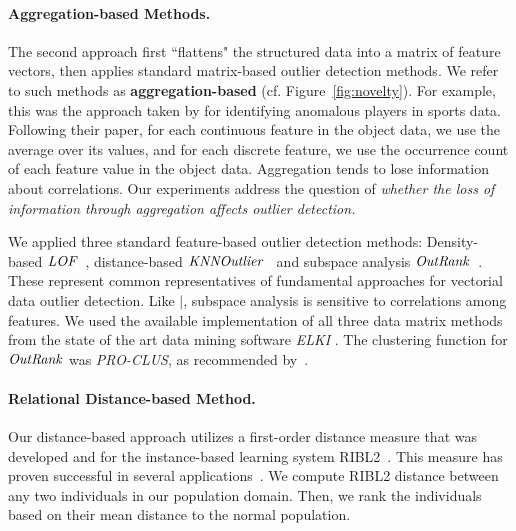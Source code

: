 {					%
					\paragraph{Aggregation-based Methods.}
					The second approach first ``flattens" the structured data into a matrix of feature vectors, then applies standard matrix-based outlier detection methods. We refer to such methods as \textbf{aggregation-based}
					(cf. Figure~\ref{fig:novelty}). For example, this was the approach taken by \citet{Breunig2000} for identifying anomalous players in sports data. Following their paper, for each continuous feature in the object data, we use the average over its values, and for each discrete feature, we use the occurrence count of each feature value in the object data. Aggregation 
					tends to lose information about correlations.
					Our experiments address the question of {\em whether the loss of information through aggregation affects outlier detection.}
					
We applied three standard feature-based outlier detection methods: Density-based $\it{LOF}$~\citep{Breunig2000}, distance-based $\it{KNNOutlier}$~\citep{Ramaswamy2000} and subspace analysis $\it{OutRank}$~\citep{Muller2012}.
					These represent common representatives of fundamental  approaches for vectorial data outlier detection. 
					Like $\mid$, subspace analysis is sensitive to correlations among features. 
					We used the available implementation of all three data matrix methods from the state of the art data mining software \textit{ELKI} \citep{Elke2013}. The clustering function for $\it{OutRank}$ was \textit{PRO-CLUS}, as recommended by~\citep{Muller2012}.
					
						\paragraph{Relational Distance-based Method.}
						Our distance-based approach utilizes a first-order distance measure that was developed and for the instance-based learning system RIBL2~\citep{Horvath2001}. This measure has proven  successful in several applications~\citep{Kirsten2001,Horvath1999}. We compute RIBL2 distance between any two individuals in our population domain. Then, we rank the individuals based on their mean distance to the normal population.
					
}

